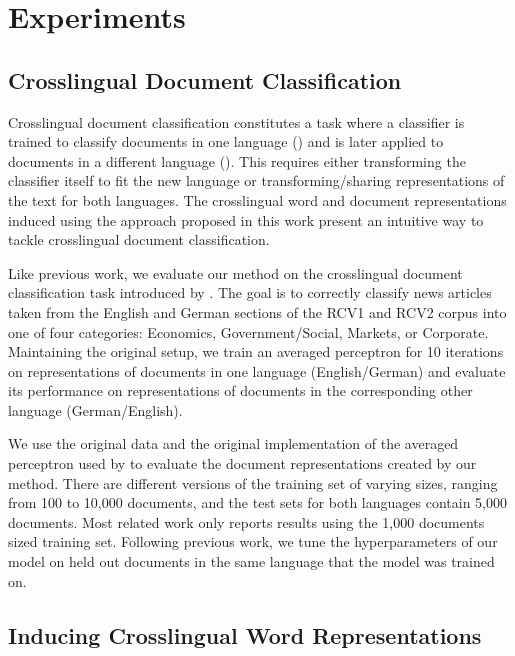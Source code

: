 \documentclass{article} \usepackage{iclr2015,times}
\begin{document}
\section{Experiments}

\subsection{Crosslingual Document Classification}

Crosslingual document classification constitutes a task where a classifier is
trained to classify documents in one language () and is later applied to
documents in a different language ().
This requires either transforming the classifier itself to fit the new language
or transforming/sharing representations of the text for both languages.
The crosslingual word and document representations induced using the approach
proposed in this work present an intuitive way to tackle crosslingual
document classification.

Like previous work, we evaluate our method on the crosslingual
document classification task introduced by \citet{klementiev2012inducing}.
The goal is to correctly classify news articles taken from
the English and German sections of the RCV1 and RCV2 corpus
\citep{lewis2004rcv1} into one of four categories:
Economics, Government/Social, Markets, or Corporate.
Maintaining the original setup, we train an averaged perceptron
\citep{collins2002discriminative} for  10 iterations on representations of
documents in one language (English/German) and evaluate its performance on
representations of documents in the corresponding other language
(German/English).

We use the original data and the original implementation of the 
averaged perceptron used by \citet{klementiev2012inducing} to evaluate
the document representations created by our method.
There are different versions of the training set of varying sizes, ranging
from 100 to 10,000 documents, and the test sets for both languages contain
5,000 documents.
Most related work only reports results using the 1,000 documents sized
training set.
Following previous work, we tune the hyperparameters of our model on held out 
documents in the same language that the model was trained on.

\subsection{Inducing Crosslingual Word Representations}
\end{document}
